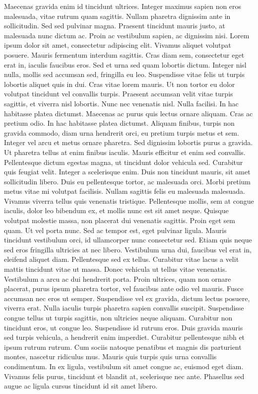 \documentclass[a4paper,11pt,twoside]{book}
\begin{document}
Maecenas gravida enim id tincidunt ultrices. Integer maximus sapien non eros malesuada, vitae rutrum quam sagittis. Nullam pharetra dignissim ante in sollicitudin. Sed sed pulvinar magna. Praesent tincidunt mauris justo, at malesuada nunc dictum ac. Proin ac vestibulum sapien, ac dignissim nisi. Lorem ipsum dolor sit amet, consectetur adipiscing elit. Vivamus aliquet volutpat posuere. Mauris fermentum interdum sagittis. Cras diam sem, consectetur eget erat in, iaculis faucibus eros. Sed et urna sed quam lobortis dictum. Integer nisl nulla, mollis sed accumsan sed, fringilla eu leo. Suspendisse vitae felis ut turpis lobortis aliquet quis in dui. Cras vitae lorem mauris. Ut non tortor eu dolor volutpat tincidunt vel convallis turpis.
Praesent accumsan velit vitae turpis sagittis, et viverra nisl lobortis. Nunc nec venenatis nisl. Nulla facilisi. In hac habitasse platea dictumst. Maecenas ac purus quis lectus ornare aliquam. Cras ac pretium odio. In hac habitasse platea dictumst. Aliquam finibus, turpis non gravida commodo, diam urna hendrerit orci, eu pretium turpis metus et sem. Integer vel arcu et metus ornare pharetra.
Sed dignissim lobortis purus a gravida. Ut pharetra tellus at enim finibus iaculis. Mauris efficitur et enim sed convallis. Pellentesque dictum egestas magna, ut tincidunt dolor vehicula sed. Curabitur quis feugiat velit. Integer a scelerisque enim. Duis non tincidunt mauris, sit amet sollicitudin libero. Duis eu pellentesque tortor, ac malesuada orci. Morbi pretium metus vitae mi volutpat facilisis. Nullam sagittis felis eu malesuada malesuada. Vivamus viverra tellus quis venenatis tristique. Pellentesque mollis, sem at congue iaculis, dolor leo bibendum ex, et mollis nunc est sit amet neque.
Quisque volutpat molestie massa, non placerat dui venenatis sagittis. Proin eget sem quam. Ut vel porta nunc. Sed ac tempor est, eget pulvinar ligula. Mauris tincidunt vestibulum orci, id ullamcorper nunc consectetur sed. Etiam quis neque sed eros fringilla ultricies at nec libero. Vestibulum urna dui, faucibus vel erat in, eleifend aliquet diam. Pellentesque sed ex tellus. Curabitur vitae lacus a velit mattis tincidunt vitae ut massa. Donec vehicula ut tellus vitae venenatis. Vestibulum a arcu ac dui hendrerit porta. Proin ultrices, quam non ornare placerat, purus ipsum pharetra tortor, vel faucibus ante odio vel mauris.
Fusce accumsan nec eros ut semper. Suspendisse vel ex gravida, dictum lectus posuere, viverra erat. Nulla iaculis turpis pharetra sapien convallis suscipit. Suspendisse congue tellus ut turpis sagittis, non ultricies neque aliquam. Curabitur non tincidunt eros, ut congue leo. Suspendisse id rutrum eros. Duis gravida mauris sed turpis vehicula, a hendrerit enim imperdiet. Curabitur pellentesque nibh et ipsum rutrum rutrum. Cum sociis natoque penatibus et magnis dis parturient montes, nascetur ridiculus mus. Mauris quis turpis quis urna convallis condimentum. In ex ligula, vestibulum sit amet congue ac, euismod eget diam. Vivamus felis purus, tincidunt et blandit at, scelerisque nec ante. Phasellus sed augue ac ligula cursus tincidunt id sit amet libero.

\pend
\endnumbering
\end{document}
